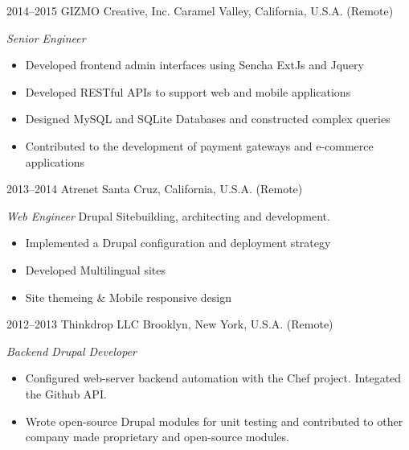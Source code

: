 \documentclass[]{friggeri-cv} %
\begin{document}
\begin{entrylist}
\entry
{2014--2015}
{GIZMO Creative, Inc.}
{Caramel Valley, California, U.S.A. (Remote)}
{\emph{Senior Engineer}
\begin{itemize}
\item Developed frontend admin interfaces using Sencha ExtJs and Jquery
\item Developed RESTful APIs to support web and mobile applications
\item Designed MySQL and SQLite Databases and constructed complex queries
\item Contributed to the development of payment gateways and e-commerce applications
\end{itemize}}
\entry
{2013--2014}
{Atrenet}
{Santa Cruz, California, U.S.A. (Remote)}
{\emph{Web Engineer}
Drupal Sitebuilding, architecting and development.
\begin{itemize}
\item Implemented a Drupal configuration and deployment strategy
\item Developed Multilingual sites
\item Site themeing \& Mobile responsive design
\end{itemize}}
\entry
{2012--2013}
{Thinkdrop LLC}
{Brooklyn, New York, U.S.A. (Remote)}
{ \emph{Backend Drupal Developer }
\begin{itemize}
\item Configured web-server backend automation with the Chef project. Integated the Github API.
\item Wrote open-source Drupal modules for unit testing and contributed to other company made proprietary and open-source modules.

\end{itemize}}
\end{entrylist}
\end{document}
